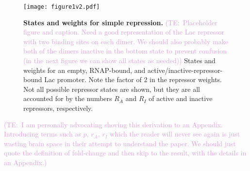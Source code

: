 \documentclass[10pt,letterpaper]{article}
\newcommand\globalScalePlots{1}
\newcommand{\talComment}[1]{\textcolor{Plum}{(TE:~#1)}}
\begin{document}
\begin{figure}[h]
	\centering \texttt{[image: figure1v2.pdf]}
	\caption{{\bf States and weights for simple repression.} 
		\talComment{Placeholder figure and caption. Need a good representation of the Lac repressor with two binding sites on each dimer. We should also probably make both of the dimers inactive in the bottom state to prevent confusion (in the next figure we can show all states as needed)}
		States and weights for an empty, RNAP-bound, and
		active/inactive-repressor-bound Lac promoter. Note the factor of 2 in the
		repressor weights. Not all possible repressor states are shown, but they are
		all accounted for by the numbers $R_A$ and $R_I$ of active and inactive
		repressors, respectively.
		}
	\label{figpolymeraseRepressorStates}
\end{figure}

\talComment{I am personally advocating shoving this derivation to an Appendix. Introducing terms such as $p$, $r_A$, $r_I$ which the reader will never see again is just wasting brain space in their attempt to understand the paper. We should just quote the definition of fold-change and then skip to the result, with the details in an Appendix.}
\end{document}
